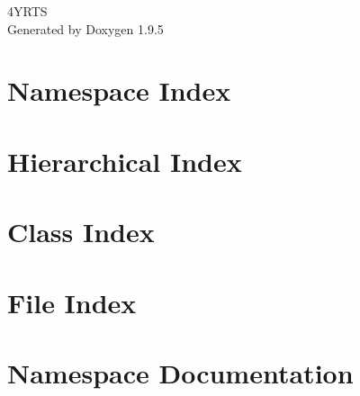 \documentclass[twoside]{book}
\newcommand{\+}{\discretionary{\mbox{\scriptsize$\hookleftarrow$}}{}{}}
\newcommand{\clearemptydoublepage}{%
    \newpage{\pagestyle{empty}\cleardoublepage}%
  }
\begin{document}
  \raggedbottom
    \hypersetup{pageanchor=false,
                bookmarksnumbered=true,
                pdfencoding=unicode
               }
  \begin{titlepage}
  \vspace*{7cm}
  \begin{center}%
  {\Large 4\+YRTS}\\
  \vspace*{1cm}
  {\large Generated by Doxygen 1.9.5}\\
  \end{center}
  \end{titlepage}
  \clearemptydoublepage
  \tableofcontents
  \clearemptydoublepage
  \hypersetup{pageanchor=true}
\chapter{Namespace Index}

\chapter{Hierarchical Index}

\chapter{Class Index}

\chapter{File Index}

\chapter{Namespace Documentation}

\end{document}
